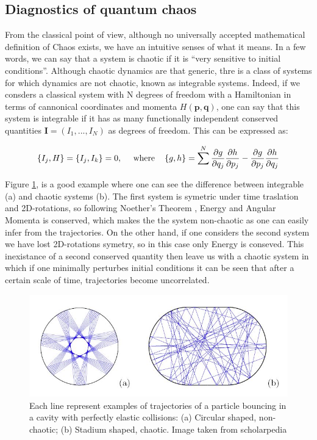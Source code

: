 \documentclass[11pt,a4paper]{article}
\begin{document}
\subsection{Diagnostics of quantum chaos}

From the classical point of view, although no universally accepted mathematical definition of Chaos exists, we have an intuitive senses of what it means. In a few words, we can say that a system is chaotic if it is \textquotedblleft very sensitive to initial conditions\textquotedblright. Although chaotic dynamics are that generic, thre is a class of systems 
for which dynamics are not chaotic, known as integrable systems. Indeed, if we consders a classical system with N degrees of freedom with a Hamiltonian in terms of cannonical coordinates and momenta $H(\mathbf{p},\mathbf{q})$, one can say that this system is integrable if it has as many functionally independent conserved quantities $\mathbf{I}=\left(I_1,...,I_N\right)$ as degrees of freedom. This can be expressed as:

\begin{equation}
    \left\{I_j,H\right\}=\left\{I_j,I_k\right\} = 0, ~~~~\text{where}~~~\left\{g,h\right\} = \sum^N\frac{\partial g}{\partial q_j}\frac{\partial h}{\partial p_j} - \frac{\partial g}{\partial p_j}\frac{\partial h}{\partial q_j}
\end{equation}

Figure \ref{Example_Chaos}, is a good example where one can see the difference between integrable (a) and chaotic systems (b). The first system is symetric under time traslation and 2D-rotations, so following Noether's Theorem \cite{Noether_1971}, Energy and Angular Momenta is conserved, which makes the the system non-chaotic as one can easily infer from the trajectories. On the other hand, if one considers the second system we have lost 2D-rotations symetry, so in this case only Energy is conseved. This inexistance of a second conserved quantity then leave us with a chaotic system in which if one minimally perturbes initial conditions it can be seen that after a certain scale of time, trajectories become uncorrelated.

\begin{figure}[ht]
    \centering
    \includegraphics[width=\linewidth]{figs/Stoe_billiards.jpg}
    \caption{Each line represent examples of trajectories of a particle bouncing in a cavity with perfectly elastic collisions: (a) Circular shaped, non-chaotic; (b) Stadium shaped, chaotic. Image taken from scholarpedia \cite{stockmann2010microwave}}
    \label{Example_Chaos}
\end{figure}
\end{document}
